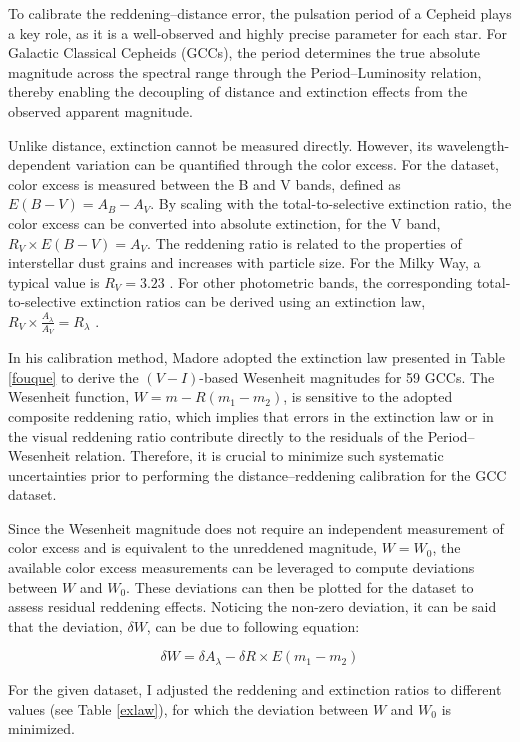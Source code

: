 To calibrate the reddening–distance error, the pulsation period of a Cepheid plays a key role, as it is a well-observed and highly precise parameter for each star. For Galactic Classical Cepheids (GCCs), the period determines the true absolute magnitude across the spectral range through the Period–Luminosity relation, thereby enabling the decoupling of distance and extinction effects from the observed apparent magnitude.

Unlike distance, extinction cannot be measured directly. However, its wavelength-dependent variation can be quantified through the color excess. For the dataset, color excess is measured between the B and V bands, defined as $E(B-V) = A_B - A_V $. By scaling with the total-to-selective extinction ratio, the color excess can be converted into absolute extinction, for the V band, $R_V \times E(B-V) = A_V$. The reddening ratio is related to the properties of interstellar dust grains and increases with particle size. For the Milky Way, a typical value is $R_V = 3.23$  \cite{2004sandage}. For other photometric bands, the corresponding total-to-selective extinction ratios can be derived using an extinction law, $R_V \times \frac{A_\lambda}{A_V} = R_\lambda$ \cite{1989cardelli}. 

In his calibration method, Madore \cite{2017madore} adopted the extinction law presented in Table \ref{fouque} \citep{2007fouque} to derive the $(V - I)$-based Wesenheit magnitudes for 59 GCCs. The Wesenheit function, $W= m - R(m_1 - m_2)$, is sensitive to the adopted composite reddening ratio, which implies that errors in the extinction law or in the visual reddening ratio contribute directly to the residuals of the Period–Wesenheit relation. Therefore, it is crucial to minimize such systematic uncertainties prior to performing the distance–reddening calibration for the GCC dataset.

Since the Wesenheit magnitude does not require an independent measurement of color excess and is equivalent to the unreddened magnitude, $W = W_0$, the available color excess measurements can be leveraged to compute deviations between \(W\) and \(W_0\). These deviations can then be plotted for the dataset to assess residual reddening effects. Noticing the non-zero deviation, it can be said that the deviation, $\delta W$, can be due to following equation:

$$\delta W = \delta A_\lambda - \delta R \times E(m_1-m_2) $$

For the given dataset, I adjusted the reddening and extinction ratios to different values (see Table \ref{exlaw}), for which the deviation between $W$ and $W_0$ is minimized.

